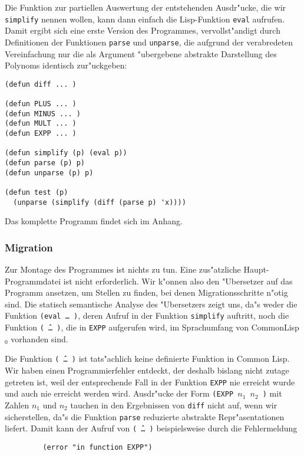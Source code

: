 Die Funktion zur partiellen Auswertung der entstehenden Ausdr"ucke, die wir
{\tt simplify} nennen wollen, kann dann einfach die Lisp-Funktion
{\tt eval} aufrufen. Damit ergibt sich eine erste Version des
Programmes, vervollst"andigt durch Definitionen der Funktionen
{\tt parse} und {\tt unparse}, die aufgrund der verabredeten Vereinfachung
nur die als Argument "ubergebene abstrakte Darstellung des Polynoms identisch
zur"uckgeben:

\begin{verbatim}
(defun diff ... )

(defun PLUS ... )
(defun MINUS ... )
(defun MULT ... )
(defun EXPP ... )

(defun simplify (p) (eval p))
(defun parse (p) p)
(defun unparse (p) p)

(defun test (p)
  (unparse (simplify (diff (parse p) 'x))))
\end{verbatim}

Das komplette Programm findet sich im Anhang.

\subsubsection*{Migration}

Zur Montage des Programmes ist nichts zu tun. Eine zus"atzliche
Haupt-Programmdatei ist nicht erforderlich. Wir k"onnen also den
"Ubersetzer auf das Programm ansetzen, um Stellen zu finden, bei denen
Migrationsschritte n"otig sind. Die statisch semantische Analyse des
"Ubersetzers zeigt uns, da"s weder die Funktion {\tt (eval\,\ldots\,)}, deren
Aufruf in der Funktion {\tt simplify} auftritt, noch die Funktion
{\tt (\^\,\ldots\,)}, die in {\tt EXPP} aufgerufen wird, im Sprachumfang
von CommonLisp$_0$ vorhanden sind.

Die Funktion {\tt (\^\,\ldots\,)} ist tats"achlich keine definierte
Funktion in Common Lisp. Wir haben einen Programmierfehler entdeckt, der
deshalb bislang nicht zutage getreten ist, weil der entsprechende Fall
in der Funktion {\tt EXPP} nie erreicht wurde und auch nie erreicht werden
wird. Ausdr"ucke der Form {\tt (EXPP $n_1$ $n_2$\,)} mit Zahlen $n_1$ und
$n_2$ tauchen in den Ergebnissen von {\tt diff} nicht auf, wenn wir
sicherstellen, da"s die Funktion {\tt parse} reduzierte abstrakte
Repr"asentationen liefert. Damit kann der Aufruf von
{\tt (\^\,\ldots\,)} beispielsweise durch die Fehlermeldung

\begin{verbatim}
         (error "in function EXPP")
\end{verbatim}

